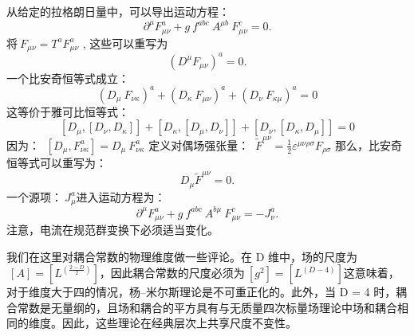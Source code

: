 从给定的拉格朗日量中，可以导出运动方程：
\[\displaystyle \ \partial ^{\mu }F_{\mu \nu }^{a}+g\ f^{abc}\ A^{\mu b}\ F_{\mu \nu }^{c}=0.~\]
将\(\displaystyle \ F_{\mu \nu }=T^{a}F_{\mu \nu }^{a}\) ,  
这些可以重写为
\[\displaystyle \ \left(D^{\mu }F_{\mu \nu }\right)^{a}=0.~\]
一个比安奇恒等式成立：
\[\displaystyle \ \left(D_{\mu }\ F_{\nu \kappa }\right)^{a}+\left(D_{\kappa }\ F_{\mu \nu }\right)^{a}+\left(D_{\nu }\ F_{\kappa \mu }\right)^{a}=0~\]
这等价于雅可比恒等式：
\[\displaystyle \ \left[D_{\mu },\left[D_{\nu },D_{\kappa }\right]\right]+\left[D_{\kappa },\left[D_{\mu },D_{\nu }\right]\right]+\left[D_{\nu },\left[D_{\kappa },D_{\mu }\right]\right]=0~\]
因为：
\(\displaystyle \ \left[D_{\mu },F_{\nu \kappa }^{a}\right]=D_{\mu }\ F_{\nu \kappa }^{a}\)
定义对偶场强张量：
\(\displaystyle \ {\tilde {F}}^{\mu \nu }={\tfrac {1}{2}}\varepsilon ^{\mu \nu \rho \sigma }F_{\rho \sigma }\)
那么，比安奇恒等式可以重写为：
\[\displaystyle \ D_{\mu }{\tilde {F}}^{\mu \nu }=0.~\]
一个源项：\(\displaystyle \ J_{\mu }^{a}\)进入运动方程为：
\[\displaystyle \ \partial ^{\mu }F_{\mu \nu }^{a}+g\ f^{abc}\ A^{b\mu }\ F_{\mu \nu }^{c}=-J_{\nu }^{a}.~\]
注意，电流在规范群变换下必须适当变化。

我们在这里对耦合常数的物理维度做一些评论。在 D 维中，场的尺度为\(\displaystyle \ \left[A\right]=\left[L^{\left({\tfrac {2-D}{2}}\right)}\right]\)，因此耦合常数的尺度必须为\(\displaystyle \ \left[g^{2}\right]=\left[L^{\left(D-4\right)}\right]\)这意味着，对于维度大于四的情况，杨–米尔斯理论是不可重正化的。此外，当 D = 4 时，耦合常数是无量纲的，且场和耦合的平方具有与无质量四次标量场理论中场和耦合相同的维度。因此，这些理论在经典层次上共享尺度不变性。
